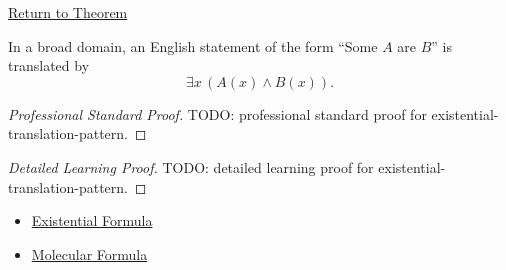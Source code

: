 \newpage
{}
\label{prf:existential-translation-pattern}

\begin{remark*}[Return]
\hyperref[prop:existential-translation-pattern]{Return to Theorem}
\end{remark*}

\begin{proposition*}
In a broad domain, an English statement of the form ``Some \(A\) are \(B\)''
is translated by
\[
\exists x\,(A(x)\land B(x)).
\]
\end{proposition*}

\begin{proof}[Professional Standard Proof]
\LRAProofBodyStart
TODO: professional standard proof for existential-translation-pattern.
\end{proof}

\begin{proof}[Detailed Learning Proof]
\LRAProofBodyStart
TODO: detailed learning proof for existential-translation-pattern.
\end{proof}

\begin{remark*}
\end{remark*}

\begin{dependencies}
\begin{itemize}
  \item \hyperref[def:existential-q]{Existential Formula}
  \item \hyperref[def:molecular]{Molecular Formula}
\end{itemize}
\end{dependencies}

\clearpage
